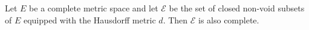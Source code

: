 Let $E$ be a complete metric space and let $\mathcal{E}$ be the set of closed non-void subsets of $E$ equipped with the Hausdorff metric $d$. Then $\mathcal{E}$ is also complete.
